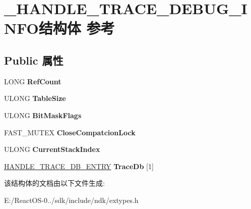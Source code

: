 \hypertarget{struct___h_a_n_d_l_e___t_r_a_c_e___d_e_b_u_g___i_n_f_o}{}\section{\+\_\+\+H\+A\+N\+D\+L\+E\+\_\+\+T\+R\+A\+C\+E\+\_\+\+D\+E\+B\+U\+G\+\_\+\+I\+N\+F\+O结构体 参考}
\label{struct___h_a_n_d_l_e___t_r_a_c_e___d_e_b_u_g___i_n_f_o}
\subsection*{Public 属性}
\begin{DoxyCompactItemize}
\item 
\mbox{\label{struct___h_a_n_d_l_e___t_r_a_c_e___d_e_b_u_g___i_n_f_o_afbe775375e635477ee04b52878e20d99}} 
L\+O\+NG {\bfseries Ref\+Count}
\item 
\mbox{\label{struct___h_a_n_d_l_e___t_r_a_c_e___d_e_b_u_g___i_n_f_o_a39c53ed237861f2bdbd224a50c7a506d}} 
U\+L\+O\+NG {\bfseries Table\+Size}
\item 
\mbox{\label{struct___h_a_n_d_l_e___t_r_a_c_e___d_e_b_u_g___i_n_f_o_a6506cafda3148ef8812a799fdb080824}} 
U\+L\+O\+NG {\bfseries Bit\+Mask\+Flags}
\item 
\mbox{\label{struct___h_a_n_d_l_e___t_r_a_c_e___d_e_b_u_g___i_n_f_o_a8af1417fbc9b82aab294df00ee348f73}} 
F\+A\+S\+T\+\_\+\+M\+U\+T\+EX {\bfseries Close\+Compatcion\+Lock}
\item 
\mbox{\label{struct___h_a_n_d_l_e___t_r_a_c_e___d_e_b_u_g___i_n_f_o_a75996cadfe1edae45cfa9127ecdce11e}} 
U\+L\+O\+NG {\bfseries Current\+Stack\+Index}
\item 
\mbox{\label{struct___h_a_n_d_l_e___t_r_a_c_e___d_e_b_u_g___i_n_f_o_aec2d1fafa59f48a1928d9d89ad86bd01}} 
\hyperlink{struct___h_a_n_d_l_e___t_r_a_c_e___d_b___e_n_t_r_y}{H\+A\+N\+D\+L\+E\+\_\+\+T\+R\+A\+C\+E\+\_\+\+D\+B\+\_\+\+E\+N\+T\+RY} {\bfseries Trace\+Db} \mbox{[}1\mbox{]}
\end{DoxyCompactItemize}


该结构体的文档由以下文件生成\+:\begin{DoxyCompactItemize}
\item 
E\+:/\+React\+O\+S-\/0../sdk/include/ndk/extypes.\+h\end{DoxyCompactItemize}
